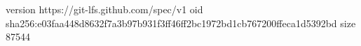 version https://git-lfs.github.com/spec/v1
oid sha256:e03faa448d8632f7a3b97b931f3ff46ff2bc1972bd1cb767200ffeca1d5392bd
size 87544
